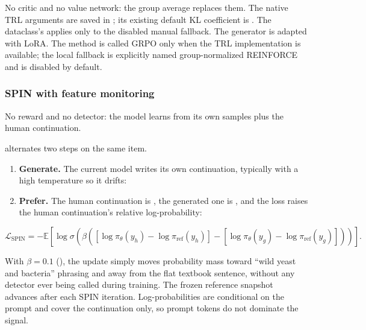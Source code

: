 No critic and no value network: the group average replaces them. The
native TRL arguments are saved in
\texttt{}; its existing default
KL coefficient is \texttt{}. The dataclass's
\texttt{} applies only to the disabled
manual fallback. The generator is adapted with LoRA. The method is
called GRPO only when the TRL implementation is available; the local
fallback is explicitly named group-normalized REINFORCE and is disabled
by default.

\subsubsection{SPIN with feature
monitoring}\label{record-docs-research-guide-md-spin-with-feature-monitoring}

No reward and no detector: the model learns from its own samples plus
the human continuation.

\texttt{} alternates two
steps on the same item.

\begin{enumerate}
\def\labelenumi{\arabic{enumi}.}
\tightlist
\item
  \textbf{Generate.} The current model writes its own continuation,
  typically with a high temperature so it drifts:
  \texttt{}
\item
  \textbf{Prefer.} The human continuation is \texttt{},
  the generated one is \texttt{}, and the loss raises
  the human continuation's relative log-probability:
\end{enumerate}

\[
\mathcal{L}_{\mathrm{SPIN}} = -\mathbb{E}\left[\log \sigma\left(\beta\left(
  \left[\log \pi_\theta(y_h) - \log \pi_{\mathrm{ref}}(y_h)\right]
- \left[\log \pi_\theta(y_g) - \log \pi_{\mathrm{ref}}(y_g)\right]\right)\right)\right].
\]

With \(\beta = 0.1\) (\texttt{}), the update simply
moves probability mass toward ``wild yeast and bacteria'' phrasing and
away from the flat textbook sentence, without any detector ever being
called during training. The frozen reference snapshot advances after
each SPIN iteration. Log-probabilities are conditional on the prompt and
cover the continuation only, so prompt tokens do not dominate the
signal.


